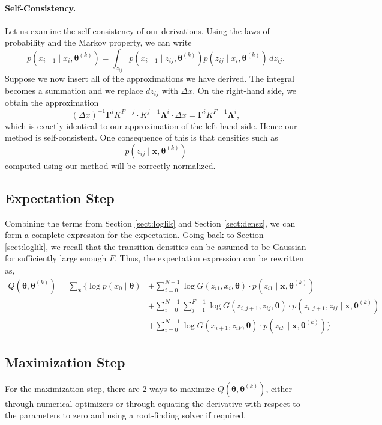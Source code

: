 \documentclass[12pt]{article}
\newcommand{\bx}{\ensuremath{\mathbf{x}}}
\newcommand{\bz}{\ensuremath{\mathbf{z}}}
\newcommand{\btheta}{\ensuremath{\boldsymbol{\theta}}}
\newcommand{\bLambda}{\ensuremath{\boldsymbol{\Lambda}}}
\newcommand{\bGamma}{\ensuremath{\boldsymbol{\Gamma}}}
\begin{document}
\paragraph{Self-Consistency.} Let us examine the self-consistency of our derivations.  Using the laws of probability and the Markov property, we can write
$$
p(x_{i+1} \mid x_i, \btheta^{(k)}) = \int_{z_{ij}} p(x_{i+1} \mid z_{ij}, \btheta^{(k)}) p( z_{ij} \mid x_i, \btheta^{(k)} ) \, dz_{ij}.
$$
Suppose we now insert all of the approximations we have derived.  The integral becomes a summation and we replace $dz_{ij}$ with $\Delta x$.  On the right-hand side, we obtain the approximation
$$
(\Delta x)^{-1} \bGamma^i K^{F - j} \cdot K^{j-1} \bLambda^i \cdot \Delta x = 
\bGamma^i K^{F-1} \bLambda^i,
$$
which is exactly identical to our approximation of the left-hand side.  Hence our method is self-consistent.  One consequence of this is that densities such as
$$
p(z_{ij} \mid \mathbf{x}, \btheta^{(k)})
$$
computed using our method will be correctly normalized.

\subsection{Expectation Step}
Combining the terms from Section \ref{sect:loglik} and Section \ref{sect:densz}, we can form a complete expression for the expectation. Going back to Section \ref{sect:loglik}, we recall that the transition densities can be assumed to be Gaussian for sufficiently large enough $F$. Thus, the expectation expression can be rewritten as,
\begin{align}
Q(\btheta, \btheta^{(k)}) = \sum_{\bz} \Big \{ \log p(x_0 \mid \btheta) & + \sum_{i=0}^{N-1} \log G(z_{i1}, x_i, \btheta) \cdot p(z_{i1} \mid \bx, \btheta^{(k)}) \nonumber \\
& + \sum_{i=0}^{N-1} \sum_{j=1}^{F-1} \log G(z_{i,j+1}, z_{ij}, \btheta) \cdot p(z_{i,j+1}, z_{ij} \mid \bx, \btheta^{(k)}) \nonumber \\
& + \sum_{i=0}^{N-1} \log G(x_{i+1}, z_{iF}, \btheta) \cdot p(z_{iF} \mid \bx, \btheta^{(k)}) \Big \}
\end{align}

\subsection{Maximization Step}
For the maximization step, there are 2 ways to maximize $Q(\btheta, \btheta^{(k)})$, either through numerical optimizers or through equating the derivative with respect to the parameters to zero and using a root-finding solver if required.
\end{document}
